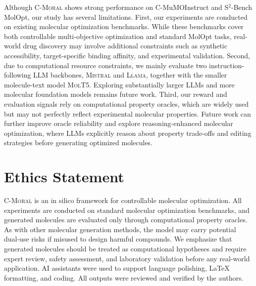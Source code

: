 \documentclass[11pt]{article}
\begin{document}
Although \textsc{C-Moral} shows strong performance on C-MuMOInstruct and S$^2$-Bench MolOpt, our study has several limitations. First, our experiments are conducted on existing molecular optimization benchmarks. While these benchmarks cover both controllable multi-objective optimization and standard MolOpt tasks, real-world drug discovery may involve additional constraints such as synthetic accessibility, target-specific binding affinity, and experimental validation. Second, due to computational resource constraints, we mainly evaluate two instruction-following LLM backbones, \textsc{Mistral} and \textsc{Llama}, together with the smaller molecule-text model \textsc{MolT5}. Exploring substantially larger LLMs and more molecular foundation models remains future work. Third, our reward and evaluation signals rely on computational property oracles, which are widely used but may not perfectly reflect experimental molecular properties. Future work can further improve oracle reliability and explore reasoning-enhanced molecular optimization, where LLMs explicitly reason about property trade-offs and editing strategies before generating optimized molecules.

\section*{Ethics Statement}

\textsc{C-Moral} is an in silico framework for controllable molecular optimization. All experiments are conducted on standard molecular optimization benchmarks, and generated molecules are evaluated only through computational property oracles. As with other molecular generation methods, the model may carry potential dual-use risks if misused to design harmful compounds. We emphasize that generated molecules should be treated as computational hypotheses and require expert review, safety assessment, and laboratory validation before any real-world application. AI assistants were used to support language polishing, LaTeX formatting, and coding.  All outputs were reviewed and verified by the authors.












%

\end{document}
